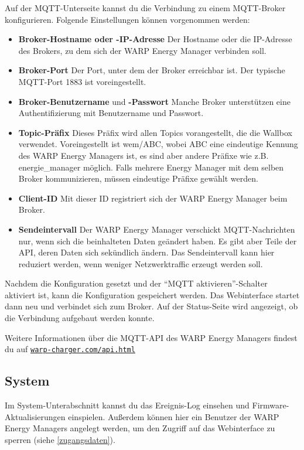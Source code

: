 \documentclass[a4paper,10pt]{article}
\newcommand{\gfx}[1]{\texttt{[image: \#1]}}
\newcommand\rurl[2]{%
  \href{#1}{\nolinkurl{#2}}%
}
\begin{document}
\begin{multicols*}{2}
	Auf der MQTT-Unterseite kannst du die Verbindung zu einem MQTT-Broker konfigurieren. Folgende Einstellungen können vorgenommen werden:
	\begin{itemize}
		\item \textbf{Broker-Hostname oder -IP-Adresse} Der Host\-name oder die
		IP-Adresse des Brokers, zu dem sich der WARP Energy Manager verbinden soll.
		\item \textbf{Broker-Port} Der Port, unter dem der Broker erreichbar ist. Der typische MQTT-Port 1883 ist voreingestellt.
		\item \textbf{Broker-Benutzername} und \textbf{-Passwort} Manche Broker unterstützen eine Authentifizierung mit Benutzername und Passwort.
		\item \textbf{Topic-Präfix} Dieses Präfix wird allen Topics vorangestellt, die die Wallbox verwendet.
		      Voreingestellt ist wem/ABC, wobei ABC eine eindeutige Kennung des
			  WARP Energy Managers ist,
		      es sind aber andere Präfixe wie z.B. energie\_manager möglich.
		      Falls mehrere Energy Manager mit dem selben Broker kommunizieren,
		      müssen eindeutige Präfixe gewählt werden.
		\item \textbf{Client-ID} Mit dieser ID registriert sich der WARP Energy Manager beim Broker.
		\item \textbf{Sendeintervall} Der WARP Energy Manager verschickt MQTT-Nachrichten nur, wenn sich die beinhalteten Daten geändert haben.
			Es gibt aber Teile der API, deren Daten sich sekündlich ändern. Das Sendeintervall kann hier reduziert werden, wenn weniger Netzwerktraffic
			erzeugt werden soll.
	\end{itemize}
	Nachdem die Konfiguration gesetzt und der \enquote{MQTT aktivieren}-Schalter aktiviert ist, kann die Konfiguration gespeichert werden.
	Das Webinterface startet dann neu und verbindet sich zum Broker.
	Auf der Status-Seite wird angezeigt, ob die Verbindung aufgebaut werden konnte.

	Weitere Informationen über die MQTT-API des WARP Energy Managers findest du auf \rurl{https://warp-charger.com/api.html}{warp-charger.com/api.html}

	\subsection{System}
	Im System-Unterabschnitt kannst du das Ereignis-Log einsehen und Firmware-Aktualisierungen einspielen.
	Außerdem können hier ein Benutzer der WARP Energy Managers angelegt werden,
	um den Zugriff auf das Webinterface zu sperren (siehe \ref{zugangsdaten}).


\end{multicols*}
\end{document}
